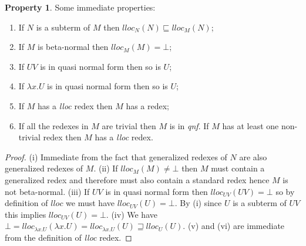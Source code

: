 \documentclass{article}
\theoremstyle{plain}
\theoremstyle{definition}
\newtheorem{property}{Property}[section]
\theoremstyle{remark}
\begin{document}
\begin{property}
\label{prop:lloc_properties}
Some immediate properties:
\begin{enumerate}[label=(\roman*)]
\item
 If $N$ is a subterm of $M$ then $lloc_N(N) \sqsubseteq lloc_M(N)$;
\item
 If $M$ is beta-normal then $lloc_M(M) = \bot$;
 \item
 If $U V$ is in quasi normal form then so is $U$;
\item
 If $\lambda x . U$ is in quasi normal form then so is $U$;
 \item If $M$ has a \emph{lloc} redex then $M$ has a redex;
 \item If all the redexes in $M$ are trivial then $M$ is in \emph{qnf}.
 If $M$ has at least one non-trivial redex then $M$ has a \emph{lloc} redex.
\end{enumerate}
\end{property}
\begin{proof}
(i) Immediate from the fact that generalized redexes of $N$ are also generalized redexes of $M$. (ii) If $lloc_M(M) \neq \bot$ then $M$ must contain a generalized redex and therefore must also contain a standard redex hence $M$ is not beta-normal.
(iii) If $U V$ is in quasi normal form then $lloc_{UV}(UV) = \bot$ so by definition of $lloc$ we must have $lloc_{UV}(U) = \bot$. By (i) since $U$ is a subterm of $UV$ this implies $lloc_{UV}(U) = \bot$.
(iv) We have $\bot = lloc_{\lambda x . U}(\lambda x . U) = lloc_{\lambda x . U}(U) \sqsupseteq lloc_{U}(U)$.
(v) and (vi) are immediate from the definition of \emph{lloc} redex.
\end{proof}
\end{document}
